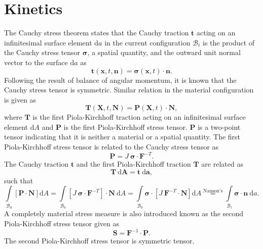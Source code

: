 \section{Kinetics}
The Cauchy stress theorem states that the Cauchy traction $\mathbf{t}$ acting on an infinitesimal surface element $\mathrm{d}a$ in the current configuration $\mathcal{B}_t$ is the product of the Cauchy stress tensor $\bm{\sigma}$, a spatial quantity, and the outward unit normal vector to the surface $\mathrm{d}a$ as 
\begin{equation}
\mathbf{t}(\mathbf{x}, t, \mathbf{n}) = \bm{\sigma}(\mathbf{x}, t) \cdot \mathbf{n}.
\end{equation}
Following the result of balance of angular momentum, it is known that the Cauchy stress tensor is symmetric. Similar relation in the material configuration is given as 
\begin{equation}
\mathbf{T}(\mathbf{X}, t, \mathbf{N}) = \mathbf{P}(\mathbf{X}, t) \cdot \mathbf{N},
\end{equation}
where $\mathbf{T}$ is the first Piola-Kirchhoff traction acting on an infinitesimal surface element $\mathrm{d}A$ and $\mathbf{P}$ is the first Piola-Kirchhoff stress tensor. $\mathbf{P}$ is a two-point tensor indicating that it is neither a material or a spatial quantity. The first Piola-Kirchhoff stress tensor is related to the Cauchy stress tensor as 
\begin{equation}
\mathbf{P} = J \ \bm{\sigma} \cdot \mathbf{F}^{-T}.
\end{equation}
The Cauchy traction $\mathbf{t}$ and the first Piola-Kirchhoff traction $\mathbf{T}$ are related as 
\begin{equation}
\mathbf{T} \ \bm{\mathrm{d}}\mathbf{A} = \mathbf{t} \ \bm{\mathrm{d}}\mathbf{a},
\end{equation}
such that
\begin{equation}
\int\limits_{\mathcal{B}_0} \left[ \mathbf{P} \cdot \mathbf{N} \right] \mathrm{d}A = \int\limits_{\mathcal{B}_0} \left[ J \ \bm{\sigma} \cdot \mathbf{F}^{-T} \right] \cdot \mathbf{N} \ \mathrm{d}A = \int\limits_{\mathcal{B}_0} \bm{\sigma} \cdot \left[ J \ \mathbf{F}^{-T} \cdot \mathbf{N} \right] \mathrm{d}A \stackrel{\text{Nanson's}}{=} \int\limits_{\mathcal{B}_t} \bm{\sigma} \cdot \mathbf{n} \ \mathrm{d}a.
\end{equation}
A completely material stress measure is also introduced known as the second Piola-Kirchhoff stress tensor given as
\begin{equation}
\mathbf{S} = \mathbf{F}^{-1} \cdot \mathbf{P}.
\end{equation}
The second Piola-Kirchhoff stress tensor is symmetric tensor.

